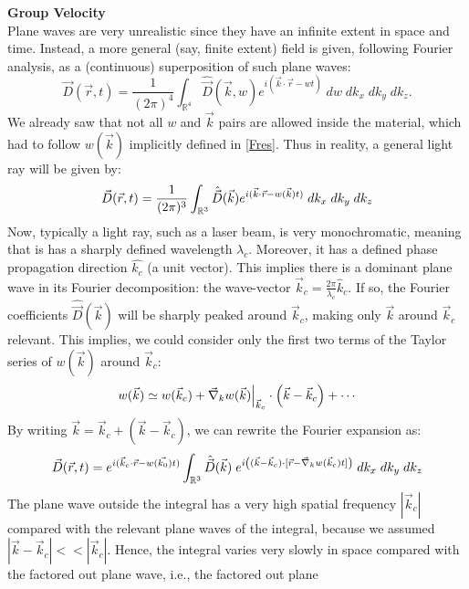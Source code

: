 \documentclass[11pt, a4paper, twoside]{article} %
\newcommand{\R}{\mathbb{R}} %
\DeclareRobustCommand{\mybox}[2][gray!10]{%
\begin{tcolorbox}[   %
        left=0.2cm,
        right=0.2cm,
        top=0.15cm,
        bottom=0.15cm,
        colback=#1,
        colframe=#1,
        width=\dimexpr\textwidth\relax, 
        enlarge left by=0mm,
        boxsep=5pt,
        arc=0pt,outer arc=0pt,
        ]
        #2
\end{tcolorbox}
}
\begin{document}
\mybox{{\bf Group Velocity\vspace{0.2cm}}\\
Plane waves are very unrealistic since they have an infinite extent in space and time. Instead, a more general (say, finite extent) field is given, following Fourier analysis, as a (continuous) superposition of such plane waves:\vspace{-0.2cm}
\begin{equation}
\vec{D}(\vec{r},t)= \frac{1}{(2\pi)^4}\int_{\R^4}\hat{\vec{D}}(\vec{k},w)e^{i(\vec{k}\cdot\vec{r}-wt)}\; dw\;dk_x\;dk_y\;dk_z.
\end{equation}
We already saw that not all $w$ and $\vec{k}$ pairs are allowed inside the material, which had to follow $w(\vec{k})$ implicitly defined in \eqref{Fres}. Thus in reality, a general light ray will be given by:\vspace{-0.2cm}
\begin{equation}
\vec{D}(\vec{r},t)= \frac{1}{(2\pi)^3}\int_{\R^3}\hat{\vec{D}}(\vec{k})e^{i(\vec{k}\cdot\vec{r}-w(\vec{k})t)} \;dk_x\;dk_y\;dk_z\vspace{-0.2cm}
\end{equation}
Now, typically a light ray, such as a laser beam, is very monochromatic, meaning that is has a sharply defined wavelength $\lambda_c$. Moreover, it has a defined phase propagation direction $\hat{k_c}$ (a unit vector). This implies there is a dominant plane wave in its Fourier decomposition: the wave-vector $\vec{k}_c=\frac{2\pi}{\lambda_c}\hat{k}_c$. If so, the Fourier coefficients $\hat{\vec{D}}(\vec{k})$ will be sharply peaked around $\vec{k}_c$, making only $\vec{k}$ around $\vec{k}_c$ relevant. This implies, we could consider only the first two terms of the Taylor series of $w(\vec{k})$ around $\vec{k}_c$:\vspace{-0.2cm}
\begin{equation}
w(\vec{k})\simeq w(\vec{k}_c)+\vec{\nabla}_kw(\vec{k})\Big\rvert_{\vec{k}_c}\cdot\qty(\vec{k}-\vec{k}_c)+\cdots\vspace{-0.2cm}
\end{equation}
By writing $\vec{k}=\vec{k}_c+(\vec{k}-\vec{k}_c)$, we can rewrite the Fourier expansion as:\vspace{-0.1cm}
\begin{equation}
\vec{D}(\vec{r},t)=e^{i(\vec{k}_c\cdot\vec{r}-w(\vec{k_0})t)}\int_{\R^3}\hat{\vec{D}}(\vec{k})\;e^{i\qty((\vec{k}-\vec{k}_c)\cdot [\vec{r}-\vec{\nabla}_kw(\vec{k}_c)t])}\;dk_x\;dk_y\;dk_z\vspace{-0.2cm}
\end{equation}
The plane wave outside the integral has a very high spatial frequency $|\vec{k}_c|$ compared with the relevant plane waves of the integral, because we assumed  $|\vec{k}-\vec{k}_c|<<|\vec{k}_c|$. Hence, the integral varies very slowly in space compared with the factored out plane wave, i.e., the factored out plane}
\end{document}
